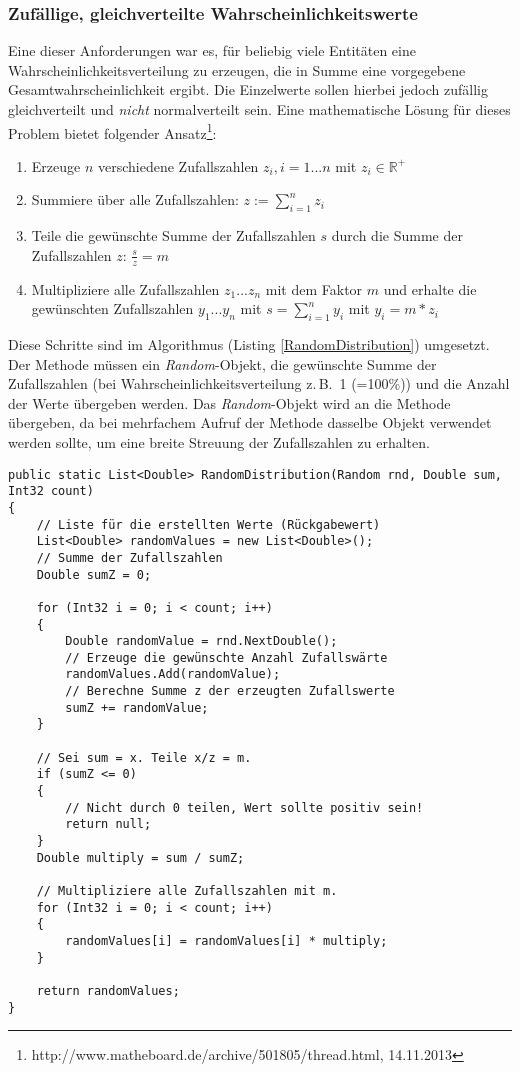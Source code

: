 \subsubsection{Zufällige, gleichverteilte Wahrscheinlichkeitswerte}
Eine dieser Anforderungen war es, für beliebig viele Entitäten eine Wahrscheinlichkeitsverteilung zu erzeugen, die in Summe eine vorgegebene Gesamtwahrscheinlichkeit ergibt. Die Einzelwerte sollen hierbei jedoch zufällig gleichverteilt und \emph{nicht} normalverteilt sein. Eine mathematische Lösung für dieses Problem bietet folgender Ansatz\footnote{http://www.matheboard.de/archive/501805/thread.html, 14.11.2013}:
\begin{enumerate}
\item Erzeuge \( n \)  verschiedene Zufallszahlen \(z_{i}, i = 1...n \) mit \(z_{i} \in \mathbb{R}^+ \) 
\item Summiere über alle Zufallszahlen: \( z:= \sum_{i=1}^{n} z_{i}\)
\item Teile die gewünschte Summe der Zufallszahlen \( s \)  durch die Summe der \\Zufallszahlen \( z \): \( \frac{s}{z} = m\)
\item Multipliziere alle Zufallszahlen \( z_{1} ... z_{n} \) mit dem Faktor \( m \) und erhalte die gewünschten Zufallszahlen \( y_{1} ... y_{n} \) mit \( s = \sum_{i=1}^{n} y_{i}\) mit \(y_{i} = m * z_{i} \)
\end{enumerate}
Diese Schritte sind im Algorithmus (Listing \ref{RandomDistribution}) umgesetzt. Der Methode müssen ein \emph{Random}-Objekt, die gewünschte Summe der Zufallszahlen (bei Wahrscheinlichkeitsverteilung z.\,B.\ 1 (=100\%)) und die Anzahl der Werte übergeben werden. Das \emph{Random}-Objekt wird an die Methode übergeben, da bei mehrfachem Aufruf der Methode dasselbe Objekt verwendet werden sollte, um eine breite Streuung der Zufallszahlen zu erhalten.

\begin{lstlisting}
public static List<Double> RandomDistribution(Random rnd, Double sum, Int32 count)
{
    // Liste für die erstellten Werte (Rückgabewert)
    List<Double> randomValues = new List<Double>();
    // Summe der Zufallszahlen
    Double sumZ = 0;

    for (Int32 i = 0; i < count; i++)
    {
        Double randomValue = rnd.NextDouble();
        // Erzeuge die gewünschte Anzahl Zufallswärte
        randomValues.Add(randomValue);
        // Berechne Summe z der erzeugten Zufallswerte
        sumZ += randomValue;
    }

    // Sei sum = x. Teile x/z = m.
    if (sumZ <= 0)
    {
        // Nicht durch 0 teilen, Wert sollte positiv sein!
        return null;
    }
    Double multiply = sum / sumZ;

    // Multipliziere alle Zufallszahlen mit m.
    for (Int32 i = 0; i < count; i++)
    {
        randomValues[i] = randomValues[i] * multiply;
    }

    return randomValues;
}
\end{lstlisting}



